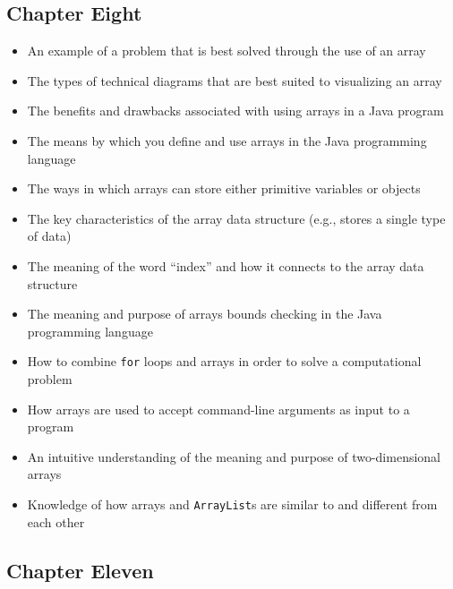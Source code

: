 \documentclass[11pt]{article}
\begin{document}
\subsection*{Chapter Eight}

\begin{itemize}

  \item An example of a problem that is best solved through the use of an array
  \item The types of technical diagrams that are best suited to visualizing an array
  \item The benefits and drawbacks associated with using arrays in a Java program
  \item The means by which you define and use arrays in the Java programming language
  \item The ways in which arrays can store either primitive variables or objects
  \item The key characteristics of the array data structure (e.g., stores a single type of data)
  \item The meaning of the word ``index'' and how it connects to the array data structure
  \item The meaning and purpose of arrays bounds checking in the Java programming language
  \item How to combine {\tt for} loops and arrays in order to solve a computational problem
  \item How arrays are used to accept command-line arguments as input to a program
  \item An intuitive understanding of the meaning and purpose of two-dimensional arrays
  \item Knowledge of how arrays and {\tt ArrayList}s are similar to and different from each other

\end{itemize}

\subsection*{Chapter Eleven}
\end{document}

